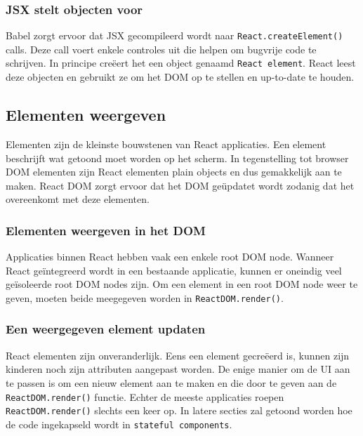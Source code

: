 \subsubsection{JSX stelt objecten voor}

Babel zorgt ervoor dat JSX gecompileerd wordt naar \texttt{React.createElement()} calls. Deze call voert enkele controles uit die helpen om bugvrije code te schrijven. In principe creëert het een object genaamd \texttt{React element}. React leest deze objecten en gebruikt ze om het DOM op te stellen en up-to-date te houden. \autocite{React2019a}

\subsection{Elementen weergeven}

Elementen zijn de kleinste bouwstenen van React applicaties. Een element beschrijft wat getoond moet worden op het scherm. In tegenstelling tot browser DOM elementen zijn React elementen plain objects en dus gemakkelijk aan te maken. React DOM zorgt ervoor dat het DOM geüpdatet wordt zodanig dat het overeenkomt met deze elementen. \autocite{React2019b}

\subsubsection{Elementen weergeven in het DOM}

Applicaties binnen React hebben vaak een enkele root DOM node. Wanneer React geïntegreerd wordt in een bestaande applicatie, kunnen er oneindig veel geïsoleerde root DOM nodes zijn. Om een element in een root DOM node weer te geven, moeten beide meegegeven worden in \texttt{ReactDOM.render()}. \autocite{React2019b}

\subsubsection{Een weergegeven element updaten}

React elementen zijn onveranderlijk. Eens een element gecreëerd is, kunnen zijn kinderen noch zijn attributen aangepast worden. De enige manier om de UI aan te passen is om een nieuw element aan te maken en die door te geven aan de \texttt{ReactDOM.render()} functie. Echter de meeste applicaties roepen \texttt{ReactDOM.render()} slechts een keer op. In latere secties zal getoond worden hoe de code ingekapseld wordt in \texttt{stateful components}. \autocite{React2019b}

